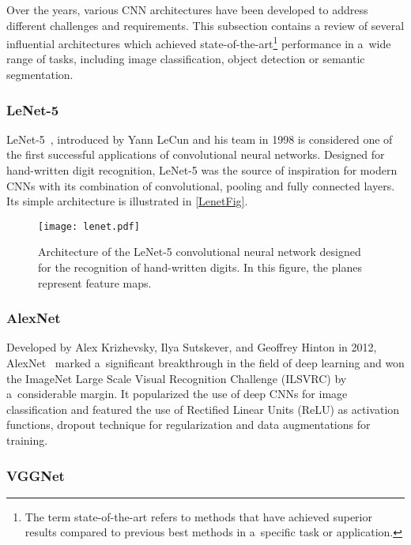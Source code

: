 Over the years, various CNN architectures have been developed to address
different challenges and requirements. This subsection contains a review of several
influential architectures which achieved state-of-the-art\footnote{The term
state-of-the-art refers to methods that have achieved superior results
compared to previous best methods in a~specific task or application.}
performance in a~wide range of tasks, including image classification, object
detection or semantic segmentation.


\subsubsection{LeNet-5}

LeNet-5~\cite{Lecun1998}, introduced by Yann LeCun and his team in 1998 is
considered one of the first successful applications of convolutional neural
networks. Designed for hand-written digit recognition, LeNet-5 was the source of
inspiration for modern CNNs with its combination of convolutional, pooling and
fully connected layers. Its simple architecture is illustrated in
\autoref{LenetFig}.

\begin{figure}[t]
    \centering
    \texttt{[image: lenet.pdf]}
    \captionsetup{width=\textwidth}
    \caption{Architecture of the LeNet-5 convolutional neural network designed
    for the recognition of hand-written digits. In this figure, the planes
    represent feature maps.~\cite{Lecun1998}}
    \label{LenetFig}
\end{figure}


\subsubsection{AlexNet}

Developed by Alex Krizhevsky, Ilya Sutskever, and Geoffrey Hinton in 2012,
AlexNet~\cite{NIPS2012} marked a~significant breakthrough in the field of deep
learning and won the ImageNet Large Scale Visual Recognition Challenge (ILSVRC)
by a~considerable margin. It popularized the use of deep CNNs for image
classification and featured the use of Rectified Linear Units (ReLU) as
activation functions, dropout technique for regularization and data
augmentations for training.


\subsubsection{VGGNet}

